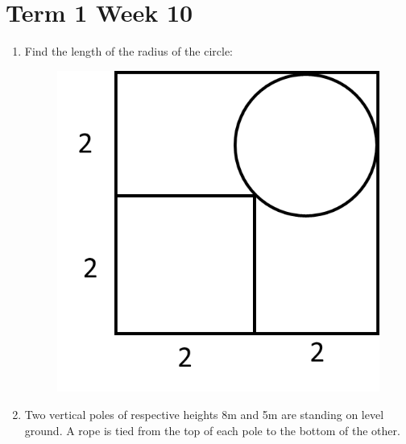 \documentclass[../main.tex]{subfiles}
\begin{document}
\section*{Term 1 Week 10}
\begin{enumerate}
    \item 
    Find the length of the radius of the circle:
    \begin{figure}[H]
        \centering
        \includegraphics{images/t1w10q1.png}
    \end{figure}
    \item 
    Two vertical poles of respective heights 8m and 5m are standing on level ground. A rope is tied from the top of each pole to the bottom of the other.\\
    

\end{enumerate}
\end{document}
